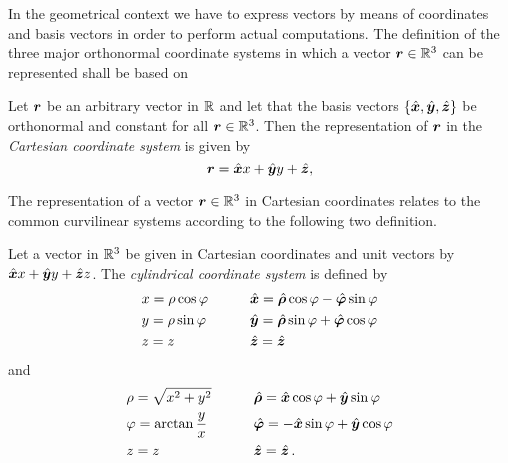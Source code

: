 In the geometrical context we have to express vectors by means of coordinates
and basis vectors in order to perform actual computations.
The definition of the three major orthonormal coordinate systems in which a
vector $\pvec{r} \in \R^3$ can be represented shall be based on 
\begin{definition}
	Let $\pvec{r}$ be an arbitrary vector in $\mathbb{R}$ and let that the
	basis vectors $\left\{\uv{x}, \uv{y}, \uv{z}\right\}$ be orthonormal and
	constant for all $\pvec{r} \in \R^3$.
	Then the representation of $\pvec{r}$ in the \emph{Cartesian coordinate
	system} is given by
	\begin{equation}
		\pvec{r} = \uv{x}x + \uv{y}y + \uv{z},
	\end{equation}
\end{definition}
The representation of a vector $\pvec{r} \in \R^3$ in Cartesian coordinates
relates to the common curvilinear systems according to the following two
definition.
\begin{definition}
	\label{def:cyl_coords}
	Let a vector in $\mathbb{R}^3$ be given in Cartesian coordinates and unit vectors
	by $\uv{x}x + \uv{y}y + \uv{z}z$.
	The \emph{cylindrical coordinate system} is defined by 
	\begin{subequations}
		\begin{align}
			&x = \rho \cos \varphi
			\qquad
			&&\uv{x} = \uv{\rho} \cos \varphi - \uv{\varphi}\sin \varphi \\
			&y = \rho \sin \varphi 
			\qquad
			&&\uv{y} = \uv{\rho} \sin \varphi + \uv{\varphi} \cos \varphi\\
			&z = z 
			\qquad
			&&\uv{z} = \uv{z} 
		\end{align}
	\end{subequations}
	and
	\begin{subequations}
		\begin{align}
			&\rho = \sqrt{x^2 + y^2}
			\qquad
			&& \uv{\rho} = \uv{x} \cos \varphi + \uv{y} \sin \varphi \\
			&\varphi = \arctan \frac{y}{x}
			\qquad
			&&\uv{\varphi} = -\uv{x} \sin \varphi + \uv{y} \cos \varphi \\
			&z = z
			\qquad
			&&\uv{z} = \uv{z} \, .
		\end{align}
	\end{subequations}
\end{definition}

